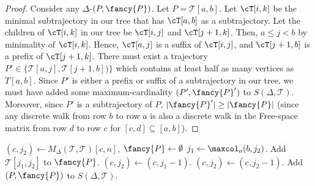 \documentclass[english, thm-restate]{lipics-v2021}
\begin{document}
\begin{proof} 
    Consider any $\Delta$-\pathlet $(P, {\fancy{P}})$.
    Let $P = \mathcal{T}[a, b]$.
    Let $\cT[i, k]$ be the minimal subtrajectory in our tree that has $\cT[a, b]$ as a subtrajectory.
    Let the children of $\cT[i, k]$ in our tree be $\cT[i, j]$ and $\cT[j+1, k]$. Then, $a \le j < b$ by minimality of $\cT[i, k]$.
    Hence, $\cT[a, j]$ is a suffix of $\cT[i, j]$, and $\cT[j+1, b]$ is a prefix of $\cT[j+1, k]$.
    There must exist a trajectory $P' \in \{ \mathcal{T}[a, j],  \mathcal{T}[j+1, b]) \}$ which contains at least half as many vertices as $T[a, b]$.
    Since $P'$ is either a prefix or suffix of a subtrajectory in our tree, we must have added some maximum-cardinality \pathlet $(P', {\fancy{P}}')$ to $S(\Delta, \mathcal{T})$.
    Moreover, since $P'$ is a subtrajectory of $P$, $|{\fancy{P}}'| \geq | {\fancy{P}}|$ (since any discrete walk from row $b$ to row $a$ is also a discrete walk in the Free-space matrix from row $d$ to row $c$ for $[c, d] \subseteq [a, b]$).
\end{proof}


 \begin{algorithm}[h]
    \caption{Query($P = \mathcal{T}[a, c]$, $\Delta$, $\mathcal{T}, S(\Delta, \mathcal{T}))$}
    \label{alg:query_fast}
    \begin{algorithmic}
    \State $(c, j_2) \gets M_\Delta(\mathcal{T}, \mathcal{T})[c, n]$, ${\fancy{P}} \gets \emptyset$ 
    \State $j_1 \gets \maxcol_a(b, j_2)$.
    \State Add    
    $\mathcal{T}[j_1, j_2]$ to  ${\fancy{P}}$.
    \State $(c, j_2) \gets (c, j_1 - 1)$.
    \Else 
    \State $(c, j_2) \gets (c, j_2 - 1)$. 
    \EndIf
    \EndWhile
    \State Add $(P, {\fancy{P}})$ to $S(\Delta, \mathcal{T})$.
    \end{algorithmic}
  \end{algorithm}
\end{document}

